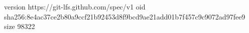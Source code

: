 version https://git-lfs.github.com/spec/v1
oid sha256:8e4ac37ce2b80a9ccf21b92453d8f9bcd9ae21add01b7f457c9c9072ad97fee9
size 98322
